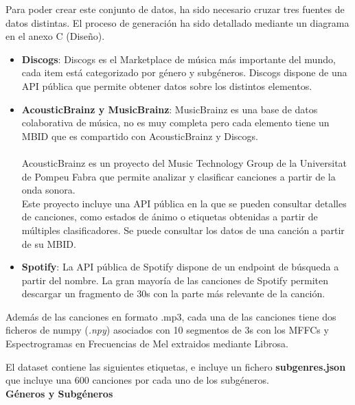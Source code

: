 Para poder crear este conjunto de datos, ha sido necesario cruzar tres
fuentes de datos distintas. El proceso de generación ha sido detallado mediante un diagrama en el anexo C (Diseño). 
\begin{itemize}
\itemsep0em
\item
  \textbf{Discogs}: Discogs \cite{a2022_discogs} es el Marketplace de música más importante del mundo, cada
  item está categorizado por género y subgéneros. Discogs dispone de una
  API pública que permite obtener datos sobre los distintos elementos.
\item
  \textbf{AcousticBrainz y MusicBrainz}: MusicBrainz \cite{musicbrainz} es una base de datos
  colaborativa de música, no es muy completa pero cada elemento tiene un
  MBID que es compartido con AcousticBrainz y Discogs.\\
  ~\\
  AcousticBrainz es un proyecto del Music Technology Group de la
  Universitat de Pompeu Fabra \cite{bogdanov2019acousticbrainz} que permite analizar y clasificar
  canciones a partir de la onda sonora.\\
  Este proyecto incluye una API pública en la que se pueden consultar detalles de
  canciones, como estados de ánimo o etiquetas obtenidas a partir de múltiples clasificadores. Se puede consultar los datos de una canción a partir de su MBID.
\item
  \textbf{Spotify}: La API pública de Spotify \cite{spotify_docs} dispone de un endpoint de búsqueda a partir del
  nombre. La gran mayoría de las canciones de Spotify permiten descargar
  un fragmento de 30s con la parte más relevante de la canción.
\end{itemize}

Además de las canciones en formato .mp3, cada una de las canciones tiene dos ficheros de numpy (\textit{.npy}) asociados con 10 segmentos de 3s con los  MFFCs y Espectrogramas en Frecuencias de Mel extraidos mediante Librosa.



El dataset contiene las siguientes etiquetas, e incluye un fichero \textbf{subgenres.json} que incluye una 600 canciones por cada uno de los subgéneros.\\
\textbf{Géneros y Subgéneros}

